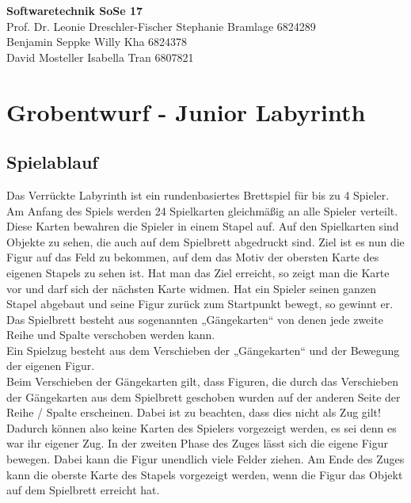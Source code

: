 \documentclass{article}
\begin{document}
\noindent
\large\textbf{Softwaretechnik SoSe 17} \\
\normalsize Prof. Dr. Leonie Dreschler-Fischer \hfill Stephanie Bramlage 6824289\\ 
\normalsize Benjamin Seppke \hfill Willy Kha 6824378\\
David Mosteller	\hfill Isabella Tran 6807821

\section{Grobentwurf - Junior Labyrinth}
\subsection{Spielablauf}
Das Verrückte Labyrinth ist ein rundenbasiertes Brettspiel für bis zu 4 Spieler.
Am Anfang des Spiels werden 24 Spielkarten gleichmäßig an alle Spieler verteilt.
Diese Karten bewahren die Spieler in einem Stapel auf.
Auf den Spielkarten sind Objekte zu sehen, die auch auf dem Spielbrett abgedruckt sind.
Ziel ist es nun die Figur auf das Feld zu bekommen, auf dem das Motiv der obersten Karte des eigenen Stapels zu sehen ist. Hat man das Ziel erreicht, so zeigt man die Karte vor und darf sich der nächsten Karte widmen. Hat ein Spieler seinen ganzen Stapel abgebaut und seine Figur zurück zum Startpunkt bewegt, so gewinnt er. \\

Das Spielbrett besteht aus sogenannten „Gängekarten“ von denen jede zweite Reihe und Spalte verschoben werden kann. \\

Ein Spielzug besteht aus dem Verschieben der „Gängekarten“ und der Bewegung der eigenen Figur. \\

Beim Verschieben der Gängekarten gilt, dass Figuren, die durch das Verschieben der Gängekarten aus dem Spielbrett geschoben wurden auf der anderen Seite der Reihe / Spalte erscheinen. Dabei ist zu beachten, dass dies nicht als Zug gilt! Dadurch können also keine Karten des Spielers vorgezeigt werden, es sei denn es war ihr eigener Zug.
In der zweiten Phase des Zuges lässt sich die eigene Figur bewegen. Dabei kann die Figur unendlich viele Felder ziehen.
Am Ende des Zuges kann die oberste Karte des Stapels vorgezeigt werden, wenn die Figur das Objekt auf dem Spielbrett erreicht hat.
\end{document}

